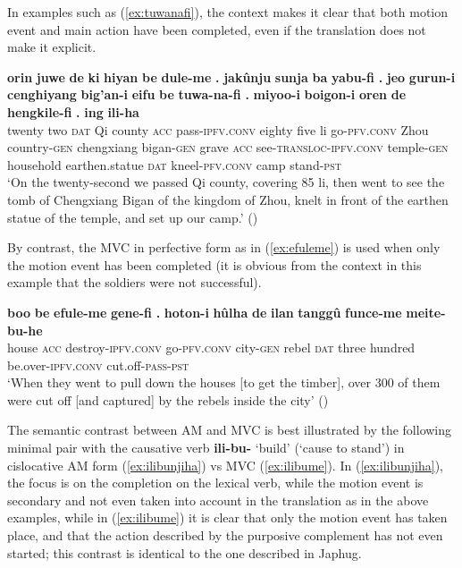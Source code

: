\documentclass{article}
\newcommand{\ipa}[1]{\textbf{{\phon\mbox{#1}}}} %
\begin{document}
In examples such as (\ref{ex:tuwanafi}), the context makes it clear that both motion event and main action have been completed, even if the translation does not make it explicit.

\begin{exe}
\ex \label{ex:tuwanafi}
\gll
\ipa{orin} 	\ipa{juwe} 	\ipa{de} 	\ipa{ki} 	\ipa{hiyan} 	\ipa{be} 	\ipa{dule-me} 	\ipa{.} 	\ipa{jakûnju} 	\ipa{sunja} 	\ipa{ba} 	\ipa{yabu-fi} 	\ipa{.} 	\ipa{jeo} 	\ipa{gurun-i} 	\ipa{cenghiyang} 	\ipa{big’an-i} 	\ipa{eifu} 	\ipa{be} 	\ipa{tuwa-na-fi} 	\ipa{.} 	\ipa{miyoo-i} 	\ipa{boigon-i} 	\ipa{oren} 	\ipa{de} 	\ipa{hengkile-fi} 	\ipa{.} 	\ipa{ing} 	\ipa{ili-ha} \\
twenty two \textsc{dat} Qi county \textsc{acc} pass-\textsc{ipfv.conv} { } eighty five li  go-\textsc{pfv.conv} { } Zhou country-\textsc{gen} chengxiang bigan-\textsc{gen} grave \textsc{acc} see-\textsc{transloc-ipfv.conv} { } temple-\textsc{gen} household earthen.statue \textsc{dat} kneel-\textsc{pfv.conv} { } camp stand-\textsc{pst} \\
\glt `On the twenty-second we passed Qi county, covering 85 li, then went to see the tomb of Chengxiang Bigan of the kingdom of Zhou, knelt in front of the earthen statue of the temple, and set up our camp.' (\citealt[83/103]{cosmo06dzengseo})
\end{exe}

By contrast, the MVC in perfective form as in (\ref{ex:efuleme}) is used when only the motion event has been completed (it is obvious from the context in this example that the soldiers were not successful).

\begin{exe}
\ex \label{ex:efuleme}
\gll
 \ipa{boo} 	\ipa{be} 	\ipa{efule-me} 	\ipa{gene-fi} 	\ipa{.} 	\ipa{hoton-i} 	\ipa{hûlha} 	\ipa{de} 	\ipa{ilan} 	\ipa{tanggû} 	\ipa{funce-me} 	\ipa{meite-bu-he} \\
 house \textsc{acc} destroy-\textsc{ipfv.conv} go-\textsc{pfv.conv} { } city-\textsc{gen} rebel \textsc{dat} three hundred be.over-\textsc{ipfv.conv} cut.off-\textsc{pass-pst} \\
 \glt ‘When they went to pull down the houses [to get the timber], over 300 of them were cut off [and captured] by the rebels inside the city’ (\citealt[69/97]{cosmo06dzengseo})
\end{exe}

The semantic contrast between AM and MVC is best illustrated by the following minimal pair with the causative verb \ipa{ili-bu-} `build' (`cause to stand') in cislocative AM form (\ref{ex:ilibunjiha}) vs MVC (\ref{ex:ilibume}). In (\ref{ex:ilibunjiha}), the focus is on the completion on the lexical verb, while the motion event is secondary and not even taken into account in the translation as in the above examples, while in (\ref{ex:ilibume}) it is clear that only the motion event has taken place, and that the action described by the purposive complement has not even started; this contrast is identical to the one described in Japhug.
\end{document}
